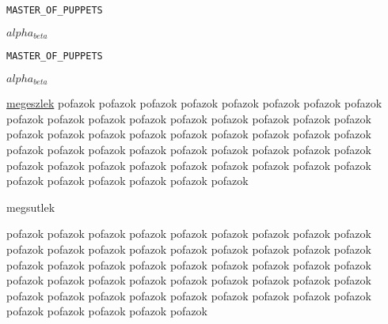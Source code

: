 \documentclass[12pt]{article}
\def\Code#1{\texttt{#1}}
\begin{document}
\Code{MASTER_OF_PUPPETS}

$alpha_{beta}$

\Code{MASTER_OF_PUPPETS}

$alpha_{beta}$

\hyperlink{CONFIG_DEBUG}{megeszlek}
pofazok pofazok pofazok pofazok pofazok pofazok pofazok pofazok pofazok pofazok
pofazok pofazok pofazok pofazok pofazok pofazok pofazok pofazok pofazok pofazok
pofazok pofazok pofazok pofazok pofazok pofazok pofazok pofazok pofazok pofazok
pofazok pofazok pofazok pofazok pofazok pofazok pofazok pofazok pofazok pofazok
pofazok pofazok pofazok pofazok pofazok pofazok pofazok pofazok pofazok pofazok

\hypertarget{CONFIG_DEBUG}{megsutlek}
pofazok pofazok pofazok pofazok pofazok pofazok pofazok pofazok pofazok pofazok
pofazok pofazok pofazok pofazok pofazok pofazok pofazok pofazok pofazok pofazok
pofazok pofazok pofazok pofazok pofazok pofazok pofazok pofazok pofazok pofazok
pofazok pofazok pofazok pofazok pofazok pofazok pofazok pofazok pofazok pofazok
pofazok pofazok pofazok pofazok pofazok pofazok pofazok pofazok pofazok pofazok
\end{document}
